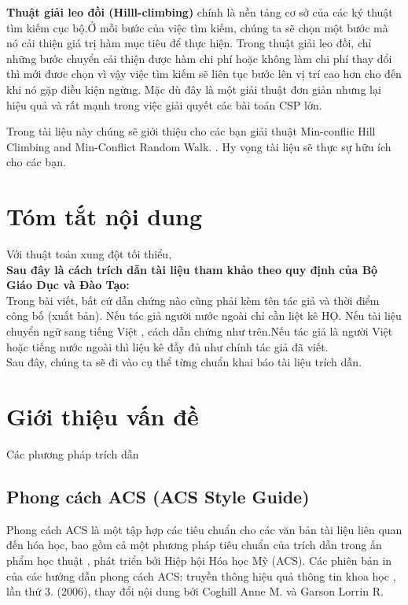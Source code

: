 \documentclass{hcmutarticle}
\begin{document}
\textbf{Thuật giải leo đồi (Hilll-climbing)}
 chính là nền tảng cơ sở của các ký thuật tìm kiếm cục bộ.Ở mỗi bước của việc tìm kiếm, chúng ta sẽ chọn một bước mà nó cải thiện giá trị hàm mục tiêu để thực hiện. Trong thuật giải leo đồi, chỉ những bước chuyển cải thiện được hàm chi phí hoặc không làm chi phí thay đổi thì mới đươc chọn vì vậy việc tìm kiếm sẽ liên tục bước lên vị trí cao hơn cho đến khi nó gặp điều kiện ngừng. Mặc dù đây là một giải thuật đơn giản nhưng lại hiệu quả  và rất mạnh trong việc giải quyết các bài toán CSP lớn.



 Trong tài liệu này chúng sẽ giới thiệu cho các bạn giải thuật Min-conflic Hill Climbing and Min-Conflict Random Walk.
. Hy vọng tài liệu sẽ thực sự hữu ích cho các bạn.\\

\newpage

\section{Tóm tắt nội dung}\label{survey}
Với thuật toán xung đột tối thiểu, \\

{\bfseries  Sau đây là cách trích dẫn tài liệu tham khảo theo quy định của Bộ Giáo Dục và Đào Tạo:}\\

Trong bài viết, bất cứ dẫn chứng nào cũng phải kèm tên tác giả và thời điểm công bố (xuất bản). Nếu tác giả người nước ngoài chỉ cần liệt kê HỌ. Nếu tài liệu chuyển ngữ sang tiếng Việt , cách dẫn chứng như trên.Nếu tác giả là người Việt hoặc tiếng nước ngoài thì liệu kê đầy đủ như chính tác giả đã viết.\\
Sau đây, chúng ta sẽ đi vào cụ thể từng chuẩn khai báo tài liệu trích dẫn.
\section{Giới thiệu vấn đề }\label{dev}
Các phương pháp trích dẫn

\subsection{Phong cách ACS (ACS Style Guide)}

Phong cách ACS là một tập hợp các tiêu chuẩn cho các văn bản tài liệu liên quan đến hóa học, bao gồm cả một phương pháp tiêu chuẩn của trích dẫn trong ấn phẩm học thuật , phát triển bởi Hiệp hội Hóa học Mỹ (ACS). Các phiên bản in của các hướng dẫn phong cách ACS: truyền thông hiệu quả thông tin khoa học , lần thứ 3. (2006), thay đổi nội dung bởi Coghill Anne M. và Garson Lorrin R.
\end{document}
